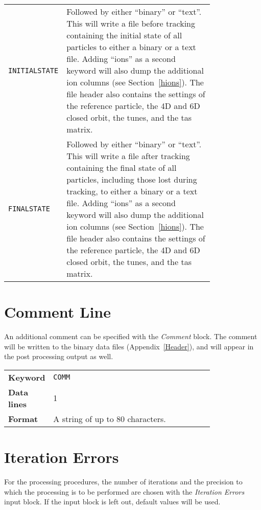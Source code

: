 \begin{tabular}{@{}lp{0.8\linewidth}}
    \texttt{INITIALSTATE} & Followed by either ``binary'' or ``text''. This will write a file before tracking containing the initial state of all particles to either a binary or a text file.\index{initial state} Adding ``ions'' as a second keyword will also dump the additional ion columns (see Section~\ref{hions}). The file header also contains the settings of the reference particle, the 4D and 6D closed orbit, the tunes, and the tas matrix. \\
    \texttt{FINALSTATE} & Followed by either ``binary'' or ``text''. This will write a file after tracking containing the final state of all particles, including those lost during tracking, to either a binary or a text file.\index{final state} Adding ``ions'' as a second keyword will also dump the additional ion columns (see Section~\ref{hions}). The file header also contains the settings of the reference particle, the 4D and 6D closed orbit, the tunes, and the tas matrix. \\
\end{tabular}


\section{Comment Line} \label{ComLin}

An additional comment can be specified with the \textit{Comment} block.
The comment will be written to the binary data files (Appendix~\ref{Header}), and will appear in the post processing output as well.

\bigskip
\begin{tabular}{@{}lp{0.8\linewidth}}
    \textbf{Keyword}    & \texttt{COMM}\index{COMM}\index{comment} \\
    \textbf{Data lines} & 1 \\
    \textbf{Format}     & A string of up to 80 characters.
\end{tabular}

\section{Iteration Errors} \label{IteErr}

For the processing procedures, the number of iterations and the precision to which the processing is to be performed are chosen with the \textit{Iteration Errors} input block.
If the input block is left out, default values will be used.

